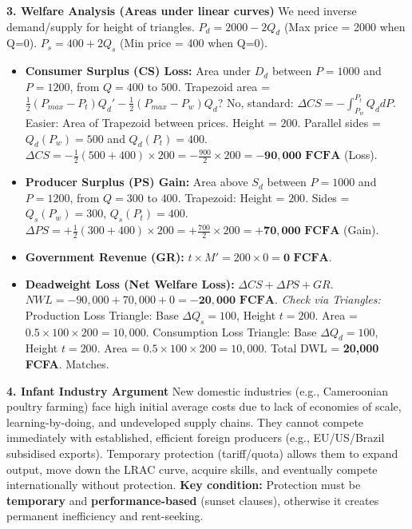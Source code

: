\documentclass[11pt]{article}
\begin{document}
\begin{exoresolu}
\textbf{3. Welfare Analysis (Areas under linear curves)}
We need inverse demand/supply for height of triangles.
$P_d = 2000 - 2Q_d$ (Max price = 2000 when Q=0).
$P_s = 400 + 2Q_s$ (Min price = 400 when Q=0).

\begin{itemize}
    \item \textbf{Consumer Surplus (CS) Loss:} Area under $D_d$ between $P=1000$ and $P=1200$, from $Q=400$ to $500$.
    Trapezoid area = $\frac{1}{2}(P_{max} - P_t)Q_d' - \frac{1}{2}(P_{max} - P_w)Q_d$? No, standard: $\Delta CS = -\int_{P_w}^{P_t} Q_d dP$.
    Easier: Area of Trapezoid between prices.
    Height = $200$. Parallel sides = $Q_d(P_w)=500$ and $Q_d(P_t)=400$.
    $\Delta CS = -\frac{1}{2}(500 + 400) \times 200 = -\frac{900}{2} \times 200 = \mathbf{-90,000 \text{ FCFA}}$ (Loss).
    
    \item \textbf{Producer Surplus (PS) Gain:} Area above $S_d$ between $P=1000$ and $P=1200$, from $Q=300$ to $400$.
    Trapezoid: Height = $200$. Sides = $Q_s(P_w)=300$, $Q_s(P_t)=400$.
    $\Delta PS = +\frac{1}{2}(300 + 400) \times 200 = +\frac{700}{2} \times 200 = \mathbf{+70,000 \text{ FCFA}}$ (Gain).
    
    \item \textbf{Government Revenue (GR):} $t \times M' = 200 \times 0 = \mathbf{0 \text{ FCFA}}$.
    
    \item \textbf{Deadweight Loss (Net Welfare Loss):} $\Delta CS + \Delta PS + GR$.
    $NWL = -90,000 + 70,000 + 0 = \mathbf{-20,000 \text{ FCFA}}$.
    \textit{Check via Triangles:}
    Production Loss Triangle: Base $\Delta Q_s = 100$, Height $t=200$. Area = $0.5 \times 100 \times 200 = 10,000$.
    Consumption Loss Triangle: Base $\Delta Q_d = 100$, Height $t=200$. Area = $0.5 \times 100 \times 200 = 10,000$.
    Total DWL = \textbf{20,000 FCFA}. Matches.
\end{itemize}

\textbf{4. Infant Industry Argument}
New domestic industries (e.g., Cameroonian poultry farming) face high initial average costs due to lack of economies of scale, learning-by-doing, and undeveloped supply chains. They cannot compete immediately with established, efficient foreign producers (e.g., EU/US/Brazil subsidised exports). Temporary protection (tariff/quota) allows them to expand output, move down the LRAC curve, acquire skills, and eventually compete internationally without protection. \textbf{Key condition:} Protection must be \textbf{temporary} and \textbf{performance-based} (sunset clauses), otherwise it creates permanent inefficiency and rent-seeking.
\end{exoresolu}
\end{document}
